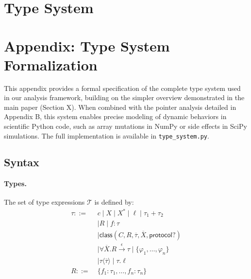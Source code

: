 \section{Type System}
\label{appendix:typesystem}
\section*{Appendix: Type System Formalization}
This appendix provides a formal specification of the complete type system used in our analysis framework, building on the simpler overview demonstrated in the main paper (Section X). When combined with the pointer analysis detailed in Appendix B, this system enables precise modeling of dynamic behaviors in scientific Python code, such as array mutations in NumPy or side effects in SciPy simulations. The full implementation is available in \texttt{type_system.py}.

\subsection{Syntax}

\paragraph{Types.} The set of type expressions $\mathcal{T}$ is defined by:
\[
\begin{aligned}
\tau ::= \;& c \mid X \mid X^* \mid \ell \mid \tau_1 + \tau_2 \\
&\mid R \mid f : \tau \\
&\mid \mathsf{class}(C, R, \overline{\tau}, \overline{X}, \mathsf{protocol}?) \\
&\mid \forall \overline{X}.R \xrightarrow{\epsilon} \tau \mid \{\varphi_1, \ldots, \varphi_n\} \\
&\mid \tau\langle\overline{\tau}\rangle \mid \tau.\ell \\
R ::= \;& \{f_1 : \tau_1, \ldots, f_n : \tau_n\}
\end{aligned}
\]

